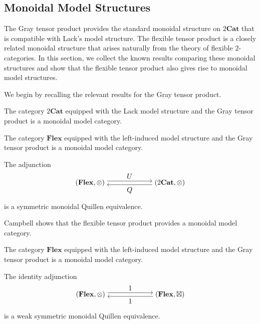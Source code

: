\documentclass{tac}
\begin{document}
\subsection*{Monoidal Model Structures}
The Gray tensor product provides the standard monoidal structure on
$2\mathbf{Cat}$ that is compatible with Lack's model structure. The
flexible tensor product is a closely related monoidal structure that
arises naturally from the theory of flexible $2$-categories. In this
section, we collect the known results comparing these monoidal structures
and show that the flexible tensor product also gives rise to monoidal
model structures.

We begin by recalling the relevant results for the Gray tensor product.

\begin{theorem}
The category $2\mathbf{Cat}$ equipped with the Lack model structure and
the Gray tensor product is a monoidal model category.
\end{theorem}

\begin{theorem}
The category $\mathbf{Flex}$ equipped with the left-induced model
structure and the Gray tensor product is a monoidal model category.
\end{theorem}

\begin{theorem}
The adjunction
\[
\begin{tikzpicture}[node distance=4cm]
\node (A) {$(\mathbf{Flex},\otimes)$};
\node (B) [right of=A] {$(2\mathbf{Cat},\otimes)$};

\draw[transform canvas={yshift=0.6ex},->] (A) -- node[above] {$U$} (B);
\draw[transform canvas={yshift=-0.6ex},<-] (A) -- node[below] {$Q$} (B);
\end{tikzpicture}
\]
is a symmetric monoidal Quillen equivalence.
\end{theorem}

Campbell shows that the flexible tensor product provides a monoidal model category.

\begin{theorem}
The category $\mathbf{Flex}$ equipped with the left-induced model
structure and the Gray tensor product is a monoidal model category.
\end{theorem}

\begin{theorem}
The identity adjunction
\[
\begin{tikzpicture}[node distance=4cm]
\node (A) {$(\mathbf{Flex},\otimes)$};
\node (B) [right of=A] {$(\mathbf{Flex},\boxtimes)$};

\draw[transform canvas={yshift=0.6ex},->] (A) -- node[above] {$1$} (B);
\draw[transform canvas={yshift=-0.6ex},<-] (A) -- node[below] {$1$} (B);
\end{tikzpicture}
\]
is a weak symmetric monoidal Quillen equivalence.
\end{theorem}
\end{document}
